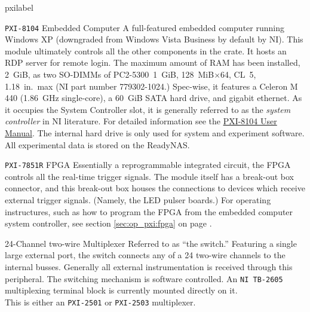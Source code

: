 \newcommand*{\pxilabel}[1]{\hspace\labelsep \normalfont\bfseries #1}
\begin{labelled}{pxilabel}

  \item[\pxislotone{} \texttt{PXI-8104}\hspace{.25em} Embedded Computer]
    A full-featured embedded computer running Windows XP (downgraded from Windows Vista Business by default by \gls{NI}).  This module ultimately controls all the other components in the crate.  It hosts an RDP server for remote login.  The maximum amount of RAM has been installed, 2~GiB, as two SO-DIMMs of PC2-5300~1~GiB, 128~MiB$\times$64, CL~5, 1.18~in.~max (\gls{NI} part number 779302-1024.)  Spec-wise, it features a Celeron M 440 (1.86~GHz single-core), a 60~GiB SATA hard drive, and gigabit ethernet.  As it occupies the \gls{System Controller} slot, it is generally referred to as the \textit{system controller} in \gls{NI} literature.  For detailed information see the \href{National Instruments Manuals/NI PXI-8104 User Manual}{PXI-8104 User Manual}.  The internal hard drive is only used for system and experiment software.  All experimental data is stored on the \gls{ReadyNAS}.  

  \item[\pxislottwo{} \texttt{PXI-7851R}\hspace{.25em} \gls{FPGA}]
    Essentially a reprogrammable integrated circuit, the FPGA controls all the real-time trigger signals.  The module itself has a break-out box connector, and this break-out box houses the connections to devices which receive external trigger signals.  (Namely, the LED pulser boards.)  For operating instructures, such as how to program the FPGA from the embedded computer system controller, see section \ref{sec:op_pxi:fpga} on page \pageref{sec:op_pxi:fpga}.

  \item[\pxislotn{3} \texttt{\FIXME}\hspace{.25em} 24-Channel two-wire Multiplexer]
    Referred to as ``the switch.''  Featuring a single large external port, the switch connects any of a 24 two-wire channels to the internal busses.  Generally all external instrumentation is received through this peripheral.  The switching mechanism is software controlled.  An \texttt{NI TB-2605} multiplexing terminal block is currently mounted directly on it.\\\noindent
    \FIXME This is either an \texttt{PXI-2501} or \texttt{PXI-2503} multiplexer.


\end{labelled}
